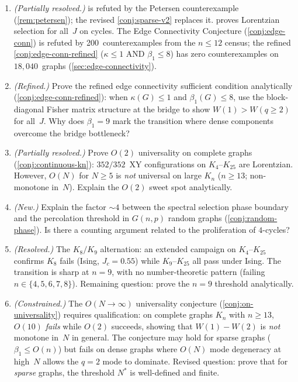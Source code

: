 \documentclass[11pt]{article}
\theoremstyle{definition}
\theoremstyle{remark}
\begin{document}
\begin{enumerate}
  \item \emph{(Partially resolved.)}  is refuted by
    the Petersen counterexample (\cref{rem:petersen}); the revised
    \cref{conj:sparse-v2} replaces it.  proves
    Lorentzian selection for all~$J$ on cycles.
    The Edge Connectivity Conjecture (\cref{conj:edge-conn}) is refuted
    by 200~counterexamples from the $n \leq 12$ census; the refined
    \cref{conj:edge-conn-refined} ($\kappa \leq 1$ AND $\beta_1 \leq 8$)
    has zero counterexamples on $18{,}040$~graphs (\cref{sec:edge-connectivity}).

  \item \emph{(Refined.)} Prove the refined edge connectivity sufficient
    condition analytically (\cref{conj:edge-conn-refined}): when
    $\kappa(G) \leq 1$ and $\beta_1(G) \leq 8$, use the block-diagonal
    Fisher matrix structure at the bridge to show $W(1) > W(q \geq 2)$ for
    all~$J$. Why does $\beta_1 = 9$ mark the transition where dense
    components overcome the bridge bottleneck?

  \item \emph{(Partially resolved.)} Prove $O(2)$ universality on complete
    graphs (\cref{conj:continuous-kn}): $352/352$~XY configurations on
    $K_4$--$K_{25}$ are Lorentzian.  However, $O(N)$ for $N \geq 5$ is
    \emph{not} universal on large $K_n$ ($n \geq 13$; non-monotone in~$N$).
    Explain the $O(2)$ sweet spot analytically.

  \item \emph{(New.)} Explain the factor ${\sim}4$ between the spectral
    selection phase boundary and the percolation threshold in
    $G(n,p)$ random graphs (\cref{conj:random-phase}). Is there
    a counting argument related to the proliferation of $4$-cycles?

  \item \emph{(Resolved.)} The $K_8 / K_9$ alternation: an extended campaign
    on $K_4$--$K_{25}$ confirms $K_8$ fails (Ising, $J_c = 0.55$) while
    $K_9$--$K_{25}$ all pass under Ising.  The transition is sharp at $n = 9$,
    with no number-theoretic pattern (failing $n \in \{4,5,6,7,8\}$).
    Remaining question: prove the $n = 9$ threshold analytically.

  \item \emph{(Constrained.)} The $O(N \to \infty)$ universality conjecture
    (\cref{conj:on-universality}) requires qualification: on complete graphs
    $K_n$ with $n \geq 13$, $O(10)$ \emph{fails} while $O(2)$ succeeds,
    showing that $W(1) - W(2)$ is \emph{not} monotone in~$N$ in general.
    The conjecture may hold for sparse graphs ($\beta_1 \leq O(n)$)
    but fails on dense graphs where $O(N)$ mode degeneracy at
    high~$N$ allows the $q = 2$ mode to dominate.
    Revised question: prove that for \emph{sparse} graphs, the
    threshold $N^*$ is well-defined and finite.


\end{enumerate}
\end{document}
